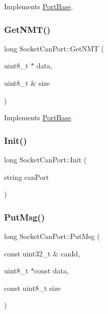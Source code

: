 Implements \hyperlink{classPortBase_a57e891d3992f70dea5c5e403350088be}{Port\+Base}.

\mbox{\label{classSocketCanPort_a2efe27bd3bb8c8127c89925e1e21535a}} 
\subsubsection{\texorpdfstring{Get\+N\+M\+T()}{GetNMT()}}
{\footnotesize\ttfamily long Socket\+Can\+Port\+::\+Get\+N\+MT (\begin{DoxyParamCaption}\item[{uint8\+\_\+t $\ast$}]{data,  }\item[{uint8\+\_\+t \&}]{size }\end{DoxyParamCaption})\hspace{0.3cm}{\ttfamily [virtual]}}



Implements \hyperlink{classPortBase_abab2bf17b01d87c2bca01cb2151aa2f1}{Port\+Base}.

\mbox{\label{classSocketCanPort_a9209d295c98c12ab85ec61773b775bf4}} 
\subsubsection{\texorpdfstring{Init()}{Init()}}
{\footnotesize\ttfamily long Socket\+Can\+Port\+::\+Init (\begin{DoxyParamCaption}\item[{string}]{can\+Port }\end{DoxyParamCaption})\hspace{0.3cm}{\ttfamily [private]}}

\mbox{\label{classSocketCanPort_a9375a0c1e33978c83ebd188100898633}} 
\subsubsection{\texorpdfstring{Put\+Msg()}{PutMsg()}}
{\footnotesize\ttfamily long Socket\+Can\+Port\+::\+Put\+Msg (\begin{DoxyParamCaption}\item[{const uint32\+\_\+t \&}]{can\+Id,  }\item[{uint8\+\_\+t $\ast$const}]{data,  }\item[{const uint8\+\_\+t}]{size }\end{DoxyParamCaption})\hspace{0.3cm}{\ttfamily [virtual]}}



